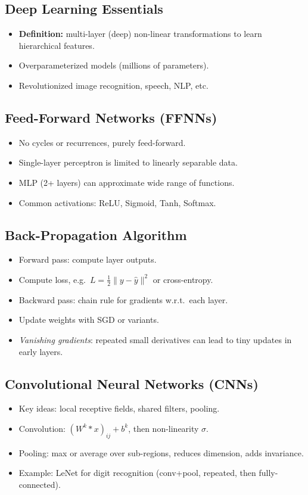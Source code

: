 \documentclass[10pt]{article}
\begin{document}
\begin{multicols}{2}
\subsection*{Deep Learning Essentials}
\begin{itemize}
\item \textbf{Definition:} multi-layer (deep) non-linear transformations to learn hierarchical features.
\item Overparameterized models (millions of parameters).
\item Revolutionized image recognition, speech, NLP, etc.
\end{itemize}

\subsection*{Feed-Forward Networks (FFNNs)}
\begin{itemize}
\item No cycles or recurrences, purely feed-forward.
\item Single-layer perceptron is limited to linearly separable data.
\item MLP (2+ layers) can approximate wide range of functions.
\item Common activations: ReLU, Sigmoid, Tanh, Softmax.
\end{itemize}

\subsection*{Back-Propagation Algorithm}
\begin{itemize}
\item Forward pass: compute layer outputs.
\item Compute loss, e.g.\ $L=\tfrac12\|y-\hat{y}\|^2$ or cross-entropy.
\item Backward pass: chain rule for gradients w.r.t.\ each layer.
\item Update weights with SGD or variants.
\item \emph{Vanishing gradients}: repeated small derivatives can lead to tiny updates in early layers.
\end{itemize}

\subsection*{Convolutional Neural Networks (CNNs)}
\begin{itemize}
\item Key ideas: local receptive fields, shared filters, pooling.
\item Convolution: $(W^k * x)_{ij} + b^k$, then non-linearity $\sigma$.
\item Pooling: max or average over sub-regions, reduces dimension, adds invariance.
\item Example: LeNet for digit recognition (conv+pool, repeated, then fully-connected).
\end{itemize}


\end{multicols}
\end{document}
